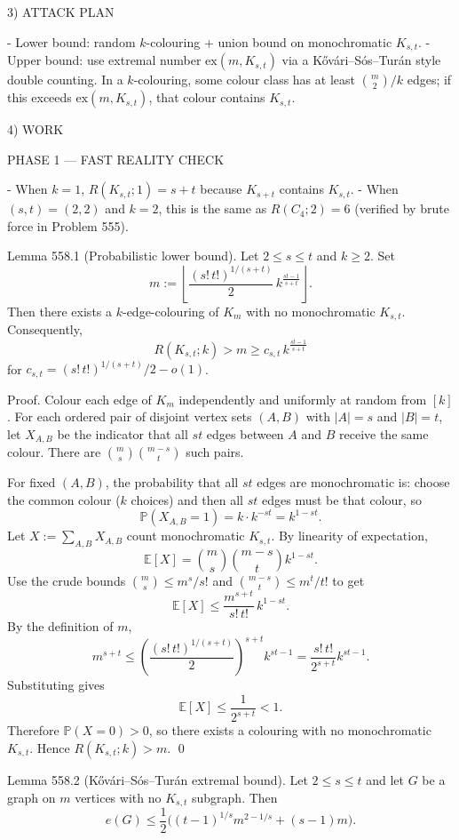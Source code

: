 3) ATTACK PLAN

- Lower bound: random $k$-colouring + union bound on monochromatic $K_{s,t}$.
- Upper bound: use extremal number $\mathrm{ex}(m,K_{s,t})$ via a K\H{o}v\'ari--S\'os--Tur\'an style double counting. In a $k$-colouring, some colour class has at least $\binom{m}{2}/k$ edges; if this exceeds $\mathrm{ex}(m,K_{s,t})$, that colour contains $K_{s,t}$.

4) WORK

PHASE 1 — FAST REALITY CHECK

- When $k=1$, $R(K_{s,t};1)=s+t$ because $K_{s+t}$ contains $K_{s,t}$.
- When $(s,t)=(2,2)$ and $k=2$, this is the same as $R(C_4;2)=6$ (verified by brute force in Problem 555).

Lemma 558.1 (Probabilistic lower bound).
Let $2\le s\le t$ and $k\ge 2$.
Set
\[
m:=\left\lfloor \frac{(s!\,t!)^{1/(s+t)}}{2}\, k^{\frac{st-1}{s+t}}\right\rfloor.
\]
Then there exists a $k$-edge-colouring of $K_m$ with no monochromatic $K_{s,t}$.
Consequently,
\[
R(K_{s,t};k) > m \ge c_{s,t}\,k^{\frac{st-1}{s+t}}
\]
for $c_{s,t}=(s!\,t!)^{1/(s+t)}/2 - o(1)$.

Proof.
Colour each edge of $K_m$ independently and uniformly at random from $[k]$.
For each ordered pair of disjoint vertex sets $(A,B)$ with $|A|=s$ and $|B|=t$, let $X_{A,B}$ be the indicator that all $st$ edges between $A$ and $B$ receive the same colour.
There are $\binom{m}{s}\binom{m-s}{t}$ such pairs.

For fixed $(A,B)$, the probability that all $st$ edges are monochromatic is:
choose the common colour ($k$ choices) and then all $st$ edges must be that colour, so
\[
\mathbb P(X_{A,B}=1)=k\cdot k^{-st}=k^{1-st}.
\]
Let $X:=\sum_{A,B} X_{A,B}$ count monochromatic $K_{s,t}$.
By linearity of expectation,
\[
\mathbb E[X]=\binom{m}{s}\binom{m-s}{t}k^{1-st}.
\]
Use the crude bounds $\binom{m}{s}\le m^s/s!$ and $\binom{m-s}{t}\le m^t/t!$ to get
\[
\mathbb E[X]\le \frac{m^{s+t}}{s!\,t!}\,k^{1-st}.
\]
By the definition of $m$,
\[
m^{s+t}\le \left(\frac{(s!\,t!)^{1/(s+t)}}{2}\right)^{s+t}k^{st-1}=\frac{s!\,t!}{2^{s+t}}k^{st-1}.
\]
Substituting gives
\[
\mathbb E[X]\le \frac{1}{2^{s+t}}<1.
\]
Therefore $\mathbb P(X=0)>0$, so there exists a colouring with no monochromatic $K_{s,t}$.
Hence $R(K_{s,t};k)>m$.
\qed

Lemma 558.2 (K\H{o}v\'ari--S\'os--Tur\'an extremal bound).
Let $2\le s\le t$ and let $G$ be a graph on $m$ vertices with no $K_{s,t}$ subgraph.
Then
\[
e(G)\le \frac12\Big((t-1)^{1/s}m^{2-1/s}+(s-1)m\Big).
\]

